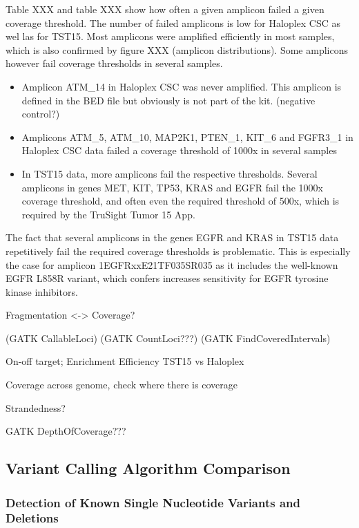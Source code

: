 Table XXX and table XXX show how often a given amplicon failed a given coverage
threshold. The number of failed amplicons is low for Haloplex CSC as wel las for TST15.
Most amplicons were amplified efficiently in most samples, which is also confirmed by figure XXX (amplicon distributions). Some amplicons however
fail coverage thresholds in several samples.
\begin{itemize}
    \item Amplicon ATM\_14 in Haloplex CSC was never amplified. This amplicon is defined in the BED file but obviously is not part of the kit. (negative control?)
    \item Amplicons ATM\_5, ATM\_10, MAP2K1, PTEN\_1, KIT\_6 and FGFR3\_1 in Haloplex CSC data failed a coverage threshold of 1000x in several samples
    \item In TST15 data, more amplicons fail the respective thresholds. Several amplicons in genes MET, KIT, TP53, KRAS and EGFR fail the 1000x coverage threshold, and often even the required threshold of 500x, which is required by the TruSight Tumor 15 App.
\end{itemize}

The fact that several amplicons in the genes EGFR and KRAS in TST15 data repetitively
fail the required coverage thresholds is problematic. This is especially the case
for amplicon 1EGFRxxE21TF035SR035 as it includes the well-known EGFR L858R variant,
which confers increases sensitivity for EGFR tyrosine kinase inhibitors.

Fragmentation <-> Coverage?

(GATK CallableLoci)
(GATK CountLoci???)
(GATK FindCoveredIntervals)

On-off target; Enrichment Efficiency TST15 vs Haloplex

Coverage across genome, check where there is coverage

Strandedness?

GATK DepthOfCoverage???

\subsection{Variant Calling Algorithm Comparison}

\subsubsection{Detection of Known Single Nucleotide Variants and Deletions}

